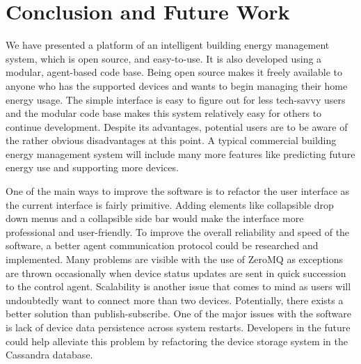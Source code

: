 \documentclass[conference]{IEEEtran}
\begin{document}
\section{Conclusion and Future Work}
\label{sec:conclusion}

We have presented a platform of an intelligent building energy management system,
which is open source, and easy-to-use. It is also developed using a modular, agent-based code base. Being open source makes it freely available to anyone who has the supported devices and wants to begin managing their home energy usage. The simple interface is easy to figure out for less tech-savvy users and the modular code base makes this system relatively easy for others to continue development. Despite its advantages, potential users are to be aware of the rather obvious disadvantages at this point. A typical commercial building energy management system will include many more features like predicting future energy use and supporting more devices.

One of the main ways to improve the software is to refactor the user interface as the current interface is fairly primitive. Adding elements like collapsible drop down menus and a collapsible side bar would make the interface more professional and user-friendly. To improve the overall reliability and speed of the software, a better agent communication protocol could be researched and implemented. Many problems are visible with the use of ZeroMQ as exceptions are thrown occasionally when device status updates are sent in quick succession to the control agent. Scalability is another issue that comes to mind as users will undoubtedly want to connect more than two devices. Potentially, there exists a better solution than publish-subscribe. One of the major issues with the software is lack of device data persistence across system restarts. Developers in the future could help alleviate this problem by refactoring the device storage system in the Cassandra database.



\end{document}
